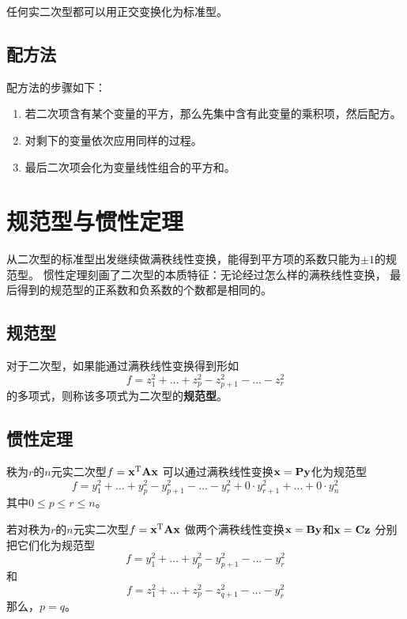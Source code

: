 \begin{theorem}[主轴定理]
  任何实二次型都可以用正交变换化为标准型。
\end{theorem}

\subsection{配方法}
配方法的步骤如下：
\begin{enumerate}
  \item
  若二次项含有某个变量的平方，那么先集中含有此变量的乘积项，然后配方。
  \item
  对剩下的变量依次应用同样的过程。
  \item
  最后二次项会化为变量线性组合的平方和。
\end{enumerate}

\section{规范型与惯性定理}
从二次型的标准型出发继续做满秩线性变换，能得到平方项的系数只能为$\pm 1$的规范型。
惯性定理刻画了二次型的本质特征：无论经过怎么样的满秩线性变换，
最后得到的规范型的正系数和负系数的个数都是相同的。

\subsection{规范型}
\begin{definition}[规范型]
  对于二次型，如果能通过满秩线性变换得到形如
  \begin{displaymath}
    f = z_1^2+\dots+z_p^2-z_{p+1}^2-\dots-z_{r}^2
  \end{displaymath}
  的多项式，则称该多项式为二次型的\textbf{规范型}。
\end{definition}

\subsection{惯性定理}
\begin{theorem}
  秩为$r$的$n$元实二次型$f=\mathbf{x}^{\textrm{T}}\mathbf{A}\mathbf{x}$
  可以通过满秩线性变换$\mathbf{x}=\mathbf{P}\mathbf{y}$化为规范型
  \begin{displaymath}
    f = y_1^2+\dots+y_p^2-y_{p+1}^2-\dots-y_{r}^2
    + 0\cdot y_{r+1}^2 + \dots + 0\cdot y_{n}^2
  \end{displaymath}
  其中$0\le p \le r \le n$。
\end{theorem}

\begin{theorem}[惯性定理]
  若对秩为$r$的$n$元实二次型$f=\mathbf{x}^{\textrm{T}}\mathbf{A}\mathbf{x}$
  做两个满秩线性变换$\mathbf{x}=\mathbf{B}\mathbf{y}$和$\mathbf{x}=\mathbf{C}\mathbf{z}$
  分别把它们化为规范型
  \begin{displaymath}
  f = y_1^2+\dots+y_p^2-y_{p+1}^2-\dots-y_{r}^2
  \end{displaymath}
  和
  \begin{displaymath}
  f = z_1^2+\dots+z_p^2-z_{q+1}^2-\dots-y_{r}^2
  \end{displaymath}
  那么，$p=q$。
\end{theorem}

